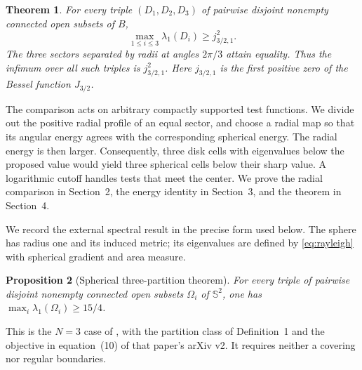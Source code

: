 \documentclass[11pt]{article}
\newtheorem{theorem}{Theorem}
\newtheorem{proposition}[theorem]{Proposition}
\newcommand{\Sph}{\mathbb S^2}
\begin{document}
\begin{theorem}\label{thm:main}
For every triple $(D_1,D_2,D_3)$ of pairwise disjoint nonempty connected open
subsets of $B$,
\[
 \max_{1\le i\le3}\lambda_1(D_i)\ge j_{3/2,1}^2.
\]
The three sectors separated by radii at angles $2\pi/3$ attain equality.
Thus the infimum over all such triples is $j_{3/2,1}^2$.
Here $j_{3/2,1}$ is the first positive zero of the Bessel function $J_{3/2}$.
\end{theorem}

The comparison acts on arbitrary compactly supported test functions.
We divide out the positive radial profile of an equal sector, and choose a
radial map so that its angular energy agrees with the corresponding
spherical energy. The radial energy is then larger. Consequently, three
disk cells with eigenvalues below the proposed value would yield three
spherical cells below their sharp value. A logarithmic cutoff handles tests
that meet the center. We prove the radial comparison in Section~2, the
energy identity in Section~3, and the theorem in Section~4.

We record the external spectral result in the precise form used below.
The sphere has radius one and its induced metric; its eigenvalues are
defined by \eqref{eq:rayleigh} with spherical gradient and area measure.
\begin{proposition}[Spherical three-partition theorem]\label{prop:sphere}
For every triple of pairwise disjoint nonempty connected open subsets
$\Omega_i$ of $\Sph$, one has
$\max_i\lambda_1(\Omega_i)\ge15/4$.
\end{proposition}
This is the $N=3$ case of \cite[Theorem~1.10]{ST}, with the partition class
of Definition~1 and the objective in equation~(10) of that paper's
arXiv v2. It requires neither a covering nor regular boundaries.
\end{document}
